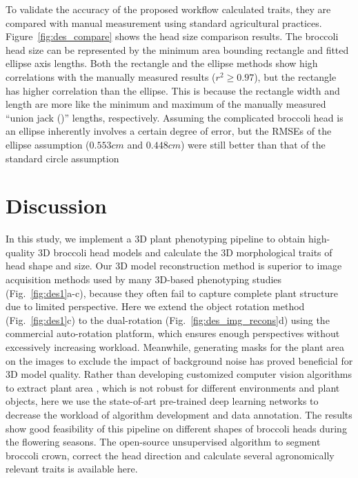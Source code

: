 To validate the accuracy of the proposed workflow calculated traits, they are compared with manual measurement using standard agricultural practices. Figure~\ref{fig:des_compare} shows the head size comparison results. The broccoli head size can be represented by the minimum area bounding rectangle and fitted ellipse axis lengths. Both the rectangle and the ellipse methods show high correlations with the manually measured results ($r^2\geq0.97$), but the rectangle has higher correlation than the ellipse. This is because the rectangle width and length are more like the minimum and maximum of the manually measured ``union jack ()'' lengths, respectively. Assuming the complicated broccoli head is an ellipse inherently involves a certain degree of error, but the RMSEs of the ellipse assumption ($0.553 cm$ and $0.448 cm$) were still better than that of the standard circle assumption \citep[Table 5, RMSE$=0.97 cm$]{blok_image_2021}



\section{Discussion}

In this study, we implement a 3D plant phenotyping pipeline to obtain high-quality 3D broccoli head models and calculate the 3D morphological traits of head shape and size. Our 3D model reconstruction method is superior to image acquisition methods used by many 3D-based phenotyping studies (Fig.~\ref{fig:des1}a-c), because they often fail to capture complete plant structure due to limited perspective. Here we extend the object rotation method (Fig.~\ref{fig:des1}c) to the dual-rotation (Fig.~\ref{fig:des_img_recons}d) using the commercial auto-rotation platform, which ensures enough perspectives without excessively increasing workload. Meanwhile, generating masks for the plant area on the images to exclude the impact of background noise has proved beneficial for 3D model quality. Rather than developing customized computer vision algorithms to extract plant area \citep{nguyen_3d_2016,kochi_3d_2018,kochi_all_2022}, which is not robust for different environments and plant objects, here we use the state-of-art pre-trained deep learning networks to decrease the workload of algorithm development and data annotation. The results show good feasibility of this pipeline on different shapes of broccoli heads during the flowering seasons. The open-source unsupervised algorithm to segment broccoli crown, correct the head direction and calculate several agronomically relevant traits is available here. 

